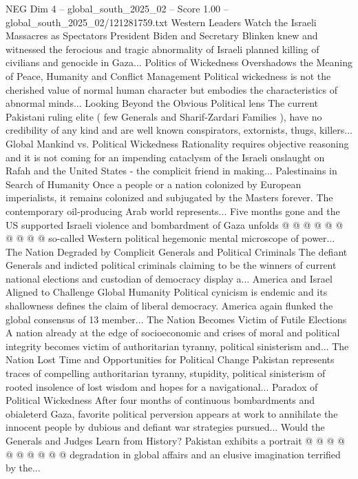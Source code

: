 \begin{textsample}{NEG Dim 4 – global\_south\_2025\_02 – Score 1.00 – global\_south\_2025\_02/121281759.txt}  \label{ex:f4_neg_438}
Western Leaders Watch the Israeli Massacres as Spectators President Biden and Secretary Blinken knew and witnessed the ferocious and tragic abnormality of Israeli planned killing of civilians and genocide in Gaza...
Politics of Wickedness Overshadows the Meaning of Peace, Humanity and Conflict Management Political wickedness is not the cherished value of normal human character but embodies the characteristics of abnormal minds...
Looking Beyond the Obvious Political lens The current Pakistani ruling elite ( few Generals and Sharif-Zardari Families ), have no credibility of any kind and are well known conspirators, extornists, thugs, killers...
Global Mankind vs.
Political Wickedness Rationality requires objective reasoning and it is not coming for an impending cataclysm of the Israeli onslaught on Rafah and the United States - the complicit friend in making...
Palestinains in Search of Humanity Once a people or a nation colonized by European imperialists, it remains colonized and subjugated by the Masters forever.
The contemporary oil-producing Arab world represents...
Five months gone and the US supported Israeli violence and bombardment of Gaza unfolds @ @ @ @ @ @ @ @ @ @ so-called Western political hegemonic mental microscope of power...
The Nation Degraded by Complicit Generals and Political Criminals The defiant Generals and indicted political criminals claiming to be the winners of current national elections and custodian of democracy display a...
America and Israel Aligned to Challenge Global Humanity Political cynicism is endemic and its shallowness defines the claim of liberal democracy.
America again flunked the global consensus of 13 member...
The Nation Becomes Victim of Futile Elections A nation already at the edge of socioeconomic and crises of moral and political integrity becomes victim of authoritarian tyranny, political sinisterism and...
The Nation Lost Time and Opportunities for Political Change Pakistan represents traces of compelling authoritarian tyranny, stupidity, political sinisterism of rooted insolence of lost wisdom and hopes for a navigational...
Paradox of Political Wickedness After four months of continuous bombardments and obialeterd Gaza, favorite political perversion appears at work to annihilate the innocent people by dubious and defiant war strategies pursued...
Would the Generals and Judges Learn from History?
Pakistan exhibits a portrait @ @ @ @ @ @ @ @ @ @ degradation in global affairs and an elusive imagination terrified by the...

\end{textsample}
